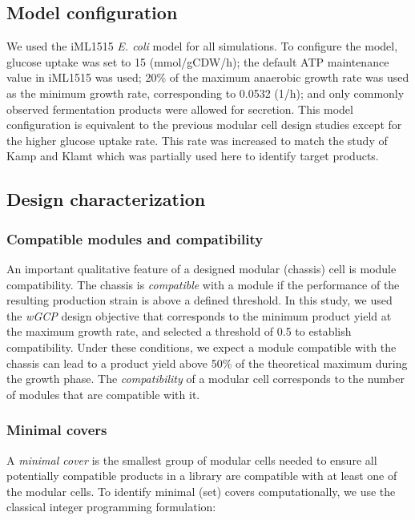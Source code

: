 {\subsection{Model configuration}
We used the iML1515 \textit{E. coli} model\citep{monk2017} for all simulations.
To configure the model, glucose uptake was set to 15 (mmol/gCDW/h); the default ATP maintenance value in iML1515 was used; 20\% of the maximum anaerobic growth rate was used as the minimum growth rate, corresponding to 0.0532 (1/h); and only commonly observed fermentation products were allowed for secretion. This model configuration is equivalent to the previous modular cell design studies\citep{garcia2019} except for the higher glucose uptake rate.
This rate was increased to match the study of Kamp and Klamt\citep{kamp2017} which was partially used here to identify target products.

\subsection{Design characterization} \label{sec:design_characterization}
\subsubsection{Compatible modules and compatibility}
An important qualitative feature of a designed modular (chassis) cell is module compatibility.
The chassis is \emph{compatible} with a module if the performance of the resulting production strain is above a defined threshold.
In this study, we used the \textit{wGCP} design objective that corresponds to the minimum product yield at the maximum growth rate,\citep{garcia2019} and selected a threshold of 0.5 to establish compatibility. Under these conditions, we expect a module compatible with the chassis can lead to a product yield above 50\% of the theoretical maximum during the growth phase.
The \emph{compatibility} of a modular cell corresponds to the number of modules that are compatible with it.

\subsubsection{Minimal covers} \label{sec:minimal_covers}
A \emph{minimal cover} is the smallest group of modular cells needed to ensure all potentially compatible products in a library are compatible with at least one of the modular cells.
To identify minimal (set) covers computationally, we use the classical integer programming formulation:

}
